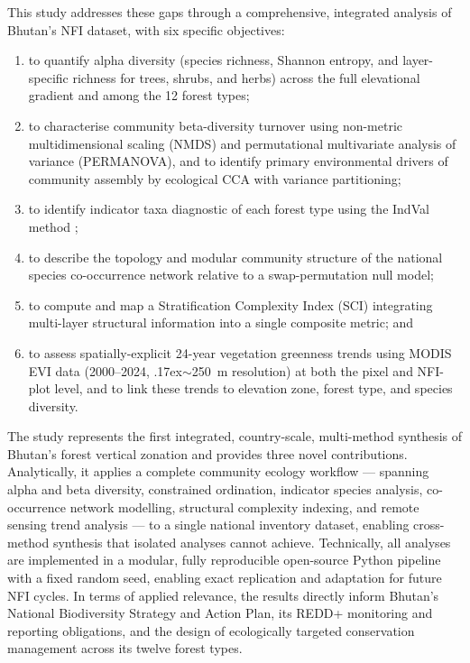 \documentclass[review,12pt,a4paper]{elsarticle}
\begin{document}
This study addresses these gaps through a comprehensive, integrated analysis
of Bhutan's NFI dataset, with six specific objectives:
\begin{enumerate}
  \item to quantify alpha diversity (species richness, Shannon entropy, and
        layer-specific richness for trees, shrubs, and herbs) across the full
        elevational gradient and among the 12 forest types;
  \item to characterise community beta-diversity turnover using non-metric
        multidimensional scaling (NMDS) and permutational multivariate analysis
        of variance (PERMANOVA), and to identify primary environmental drivers
        of community assembly by ecological CCA with variance partitioning;
  \item to identify indicator taxa diagnostic of each forest type using the
        IndVal method \citep{dufresne1997};
  \item to describe the topology and modular community structure of the
        national species co-occurrence network relative to a swap-permutation
        null model;
  \item to compute and map a Stratification Complexity Index (SCI)
        integrating multi-layer structural information into a single composite
        metric; and
  \item to assess spatially-explicit 24-year vegetation greenness trends using
        MODIS EVI data (2000--2024, {\raise.17ex\hbox{$\scriptstyle\sim$}}250~m resolution) at both the pixel and
        NFI-plot level, and to link these trends to elevation zone, forest
        type, and species diversity.
\end{enumerate}

The study represents the first integrated, country-scale, multi-method
synthesis of Bhutan's forest vertical zonation and provides three novel
contributions. Analytically, it applies a complete community ecology
workflow --- spanning alpha and beta diversity, constrained ordination,
indicator species analysis, co-occurrence network modelling, structural
complexity indexing, and remote sensing trend analysis --- to a single
national inventory dataset, enabling cross-method synthesis that isolated
analyses cannot achieve. Technically, all analyses are implemented in a
modular, fully reproducible open-source Python pipeline with a fixed random
seed, enabling exact replication and adaptation for future NFI cycles. In
terms of applied relevance, the results directly inform Bhutan's National
Biodiversity Strategy and Action Plan, its REDD+ monitoring and reporting
obligations, and the design of ecologically targeted conservation management
across its twelve forest types.
\end{document}
